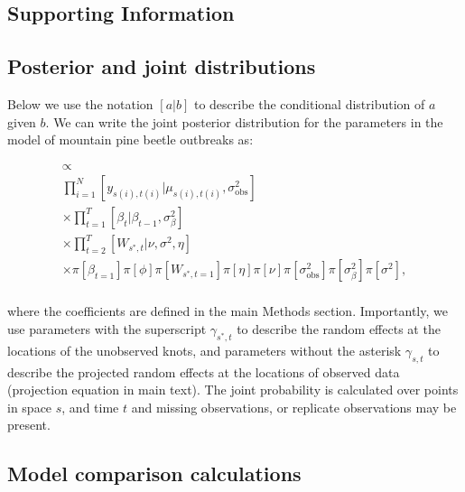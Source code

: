 \documentclass[12pt,english]{article}
\begin{document}
\begin{spacing}{1.2}

\clearpage

\section{Supporting Information}

\subsection{Posterior and joint distributions}
Below we use the notation $[a|b]$ to describe the conditional distribution of
$a$ given $b$. We can write the joint posterior distribution for the parameters
in the model of mountain pine beetle outbreaks as:

\begin{multline}
  [\bm{\mu},
  \bm{\gamma},
  \bm{W},
  \bm{\beta},
  \phi,
  \eta,
  \nu,
  \sigma^2_{\mathrm{obs}},
  \sigma^2_{\beta},
  \sigma^2
  |
  \bm{y}]
  \propto \\
  \prod_{i=1}^{N}
  [y_{s(i),t(i)} | \mu_{s(i),t(i)}, \sigma^2_{\mathrm{obs}}] \\
  \times \prod_{t=1}^{T}[\beta_t | \beta_{t-1}, \sigma^2_{\beta}] \\
  \times \prod_{t=2}^{T}[W_{s^{*},t} | \nu, \sigma^2, \eta] \\
  \times
  \pi[\beta_{t=1}]
  \pi[\phi]
  \pi[W_{s^{*},t=1}]
  \pi[\eta]
  \pi[\nu]
  \pi[\sigma^2_{\mathrm{obs}}]
  \pi[\sigma^2_{\beta}]
  \pi[\sigma^2],
  \\
\end{multline}

\noindent where the coefficients are defined in the main Methods section. Importantly,
we use parameters with the superscript $\gamma_{s^{*},t}$ to describe the random effects at the 
locations of the unobserved knots, and parameters without the asterisk $\gamma_{s,t}$ to describe the 
projected random effects at the locations of observed data (projection equation in main text). The
joint probability is calculated over points in space $s$, and time $t$ and missing observations,
or replicate observations may be present. 

\subsection{Model comparison calculations}


\end{spacing}
\end{document}
